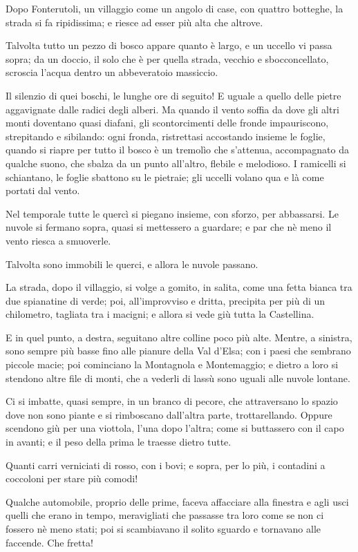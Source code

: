Dopo Fonterutoli, un villaggio come un angolo di case, con quattro botteghe, la strada si fa ripidissima; e riesce ad esser più alta che altrove.

Talvolta tutto un pezzo di bosco appare quanto è largo, e un uccello vi passa sopra; da un doccio, il solo che è per quella strada, vecchio e sbocconcellato, scroscia l’acqua dentro un abbeveratoio massiccio.

Il silenzio di quei boschi, le lunghe ore di seguito! E uguale a quello delle pietre aggavignate dalle radici degli alberi. Ma quando il vento soffia da dove gli altri monti doventano quasi diafani, gli scontorcimenti delle fronde impauriscono, strepitando e sibilando: ogni fronda, ristrettasi accostando insieme le foglie, quando si riapre per tutto il bosco è un tremolìo che s’attenua, accompagnato da qualche suono, che sbalza da un punto all’altro, flebile e melodioso. I ramicelli si schiantano, le foglie sbattono su le pietraie; gli uccelli volano qua e là come portati dal vento.

Nel temporale tutte le quercì si piegano insieme, con sforzo, per abbassarsi. Le nuvole si fermano sopra, quasi si mettessero a guardare; e par che nè meno il vento riesca a smuoverle.

Talvolta sono immobili le querci, e allora le nuvole passano.

La strada, dopo il villaggio, si volge a gomito, in salita, come una fetta bianca tra due spianatine di verde; poi, all’improvviso e dritta, precipita per più di un chilometro, tagliata tra i macigni; e allora si vede giù tutta la Castellina.

E in quel punto, a destra, seguitano altre colline poco più alte. Mentre, a sinistra, sono sempre più basse fino alle pianure della Val d’Elsa; con i paesi che sembrano piccole macie; poi cominciano la Montagnola e Montemaggio; e dietro a loro si stendono altre file di monti, che a vederli di lassù sono uguali alle nuvole lontane.

Ci si imbatte, quasi sempre, in un branco di pecore, che attraversano lo spazio dove non sono piante e si rimboscano dall'altra parte, trottarellando. Oppure scendono giù per una viottola, l’una dopo l’altra; come si buttassero con il capo in avanti; e il peso della prima le traesse dietro tutte.

Quanti carri verniciati di rosso, con i bovi; e sopra, per lo più, i contadini a coccoloni per stare più comodi!

Qualche automobile, proprio delle prime, faceva affacciare alla finestra e agli usci quelli che erano in tempo, meravigliati che passasse tra loro come se non ci fossero nè meno stati; poi si scambiavano il solito sguardo e tornavano alle faccende. Che fretta!

